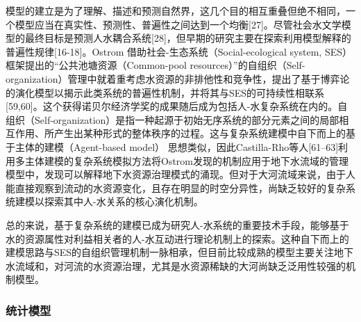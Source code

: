 模型的建立是为了理解、描述和预测自然界，这几个目的相互重叠但绝不相同，一个模型应当在真实性、预测性、普遍性之间达到一个均衡[27]。尽管社会水文学模型的最终目标是预测人水耦合系统[28]，但早期的研究主要在探索利用模型解释的普遍性规律[16-18]。Ostrom 借助社会-生态系统（Social-ecological system, SES）框架提出的“公共池塘资源（Common-pool resources）”的自组织（Self-organization）管理中就着重考虑水资源的非排他性和竞争性，提出了基于博弈论的演化模型以揭示此类系统的普遍性机制，并将其与SES的可持续性相联系[59,60]。这个获得诺贝尔经济学奖的成果随后成为包括人-水复杂系统在内的。自组织（Self-organization）是指一种起源于初始无序系统的部分元素之间的局部相互作用、所产生出某种形式的整体秩序的过程。这与复杂系统建模中自下而上的基于主体的建模（Agent-based model） 思想类似，因此Castilla-Rho等人[61–63]利用多主体建模的复杂系统模拟方法将Ostrom发现的机制应用于地下水流域的管理模型中，发现可以解释地下水资源治理模式的涌现。但对于大河流域来说，由于人能直接观察到流动的水资源变化，且存在明显的时空分异性，尚缺乏较好的复杂系统建模以探索其中人-水关系的核心演化机制。

总的来说，基于复杂系统的建模已成为研究人-水系统的重要技术手段，能够基于水的资源属性对利益相关者的人-水互动进行理论机制上的探索。这种自下而上的建模思路与SES的自组织管理机制一脉相承，但目前比较成熟的模型主要关注地下水流域和，对河流的水资源治理，尤其是水资源稀缺的大河尚缺乏泛用性较强的机制模型。
\subsubsection*{统计模型}
